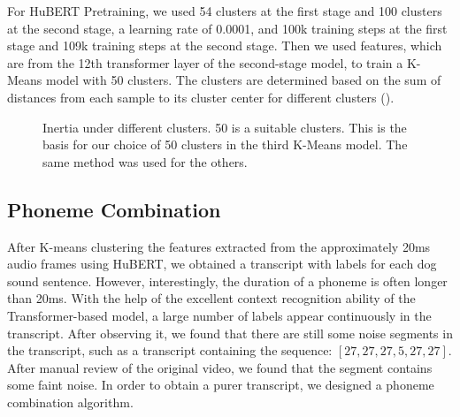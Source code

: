 For HuBERT Pretraining, we used 54 clusters at the first stage and 100 clusters at the second stage, a learning rate of 0.0001, and 100k training steps at the first stage and 109k training steps at the second stage. Then we used features, which are from the 12th transformer layer of the second-stage model, to train a K-Means model with 50 clusters. The clusters are determined based on the sum of distances from each sample to its cluster center for different clusters ().

\begin{figure}[h]
    \centering
    \caption{Inertia under different clusters. 50 is a suitable clusters. This is the basis for our choice of 50 clusters in the third K-Means model. The same method was used for the others.}
    \label{fig:clusters}
\end{figure}

\subsection{Phoneme Combination}
After K-means clustering the features extracted from the approximately 20ms audio frames using HuBERT, we obtained a transcript with labels for each dog sound sentence. However, interestingly, the duration of a phoneme is often longer than 20ms. With the help of the excellent context recognition ability of the Transformer-based model, a large number of labels appear continuously in the transcript. After observing it, we found that there are still some noise segments in the transcript, such as a transcript containing the sequence: $[27, 27, 27, 5, 27, 27]$. After manual review of the original video, we found that the segment contains some faint noise. In order to obtain a purer transcript, we designed a phoneme combination algorithm.



